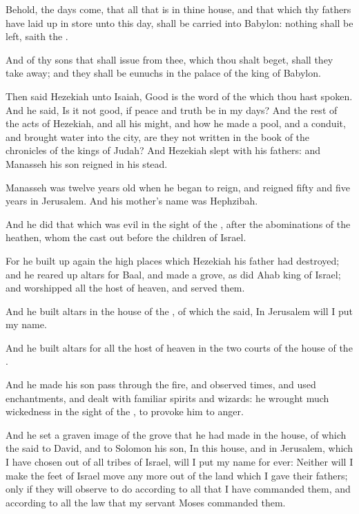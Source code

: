 \Verse Behold, the days come, that all that is in thine house, and that which thy fathers have laid up in store unto this day, shall be carried into Babylon: nothing shall be left, saith the \LORD.

\Verse And of thy sons that shall issue from thee, which thou shalt beget, shall they take away; and they shall be eunuchs in the palace of the king of Babylon.

\Verse Then said Hezekiah unto Isaiah, Good is the word of the \LORD which thou hast spoken. And he said, Is it not good, if peace and truth be in my days?  \Verse And the rest of the acts of Hezekiah, and all his might, and how he made a pool, and a conduit, and brought water into the city, are they not written in the book of the chronicles of the kings of Judah?  \Verse And Hezekiah slept with his fathers: and Manasseh his son reigned in his stead.


\Chapter
\Verse Manasseh was twelve years old when he began to reign, and reigned fifty and five years in Jerusalem. And his mother's name was Hephzibah.

\Verse And he did that which was evil in the sight of the \LORD, after the abominations of the heathen, whom the \LORD cast out before the children of Israel.

\Verse For he built up again the high places which Hezekiah his father had destroyed; and he reared up altars for Baal, and made a grove, as did Ahab king of Israel; and worshipped all the host of heaven, and served them.

\Verse And he built altars in the house of the \LORD, of which the \LORD said, In Jerusalem will I put my name.

\Verse And he built altars for all the host of heaven in the two courts of the house of the \LORD.

\Verse And he made his son pass through the fire, and observed times, and used enchantments, and dealt with familiar spirits and wizards: he wrought much wickedness in the sight of the \LORD, to provoke him to anger.

\Verse And he set a graven image of the grove that he had made in the house, of which the \LORD said to David, and to Solomon his son, In this house, and in Jerusalem, which I have chosen out of all tribes of Israel, will I put my name for ever: \Verse Neither will I make the feet of Israel move any more out of the land which I gave their fathers; only if they will observe to do according to all that I have commanded them, and according to all the law that my servant Moses commanded them.

